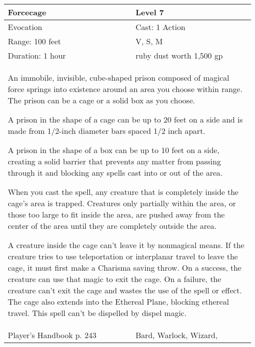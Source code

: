 \documentclass[11pt]{report}
\begin{document}
\begin{table}[H]
	\begin{tabular}{||p{6cm}|p{6cm}||}
		\hline\hline
		\bf{Forcecage} & Level 7\\ \hline
		Evocation & Cast: 1 Action\\ \hline
		Range: 100 feet & V, S, M\\ \hline
		Duration: 1 hour & ruby dust worth 1,500 gp\\ \hline
		\multicolumn{2}{||p{12cm}||}{An immobile, invisible, cube-shaped prison composed of magical force springs into existence around an area you choose within range. The prison can be a cage or a solid box as you choose.

A prison in the shape of a cage can be up to 20 feet on a side and is made from 1/2-inch diameter bars spaced 1/2 inch apart.

A prison in the shape of a box can be up to 10 feet on a side, creating a solid barrier that prevents any matter from passing through it and blocking any spells cast into or out of the area.

When you cast the spell, any creature that is completely inside the cage’s area is trapped. Creatures only partially within the area, or those too large to fit inside the area, are pushed away from the center of the area until they are completely outside the area.

A creature inside the cage can’t leave it by nonmagical means. If the creature tries to use teleportation or interplanar travel to leave the cage, it must first make a Charisma saving throw. On a success, the creature can use that magic to exit the cage. On a failure, the creature can’t exit the cage and wastes the use of the spell or effect. The cage also extends into the Ethereal Plane, blocking ethereal travel.
This spell can’t be dispelled by dispel magic.}\\ \hline
Player's Handbook p. 243 & Bard, Warlock, Wizard, \\ \hline\hline
	\end{tabular}
\end{table}
\end{document}
